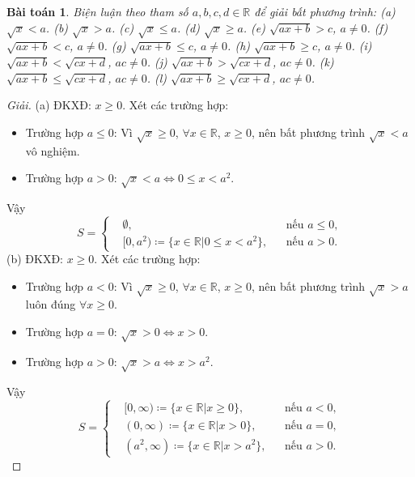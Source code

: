 \documentclass{article}
\newtheorem{baitoan}{Bài toán}
\begin{document}
\begin{baitoan}
	Biện luận theo tham số $a,b,c,d\in\mathbb{R}$ để giải bất phương trình: (a) $\sqrt{x} < a$. (b) $\sqrt{x} > a$. (c) $\sqrt{x}\le a$. (d) $\sqrt{x}\ge a$. (e) $\sqrt{ax + b} > c$, $a\ne0$. (f) $\sqrt{ax + b} < c$, $a\ne0$. (g) $\sqrt{ax + b}\le c$, $a\ne0$. (h) $\sqrt{ax + b}\ge c$, $a\ne0$. (i) $\sqrt{ax + b} < \sqrt{cx + d}$, $ac\ne0$. (j) $\sqrt{ax + b} > \sqrt{cx + d}$, $ac\ne0$. (k) $\sqrt{ax + b}\le\sqrt{cx + d}$, $ac\ne0$. (l) $\sqrt{ax + b}\ge\sqrt{cx + d}$, $ac\ne0$.
\end{baitoan}

\begin{proof}[Giải]
	(a) ĐKXĐ: $x\ge0$. Xét các trường hợp:
	\begin{itemize}
		\item Trường hợp $a\le0$: Vì $\sqrt{x}\ge0$, $\forall x\in\mathbb{R}$, $x\ge 0$, nên bất phương trình $\sqrt{x} < a$ vô nghiệm.
		\item Trường hợp $a > 0$: $\sqrt{x} < a\Leftrightarrow0\le x < a^2$.
	\end{itemize}
	Vậy 
	\begin{equation*}
		S = \left\{\begin{split}
			&\emptyset,&&\mbox{nếu } a\le0,\\
			&[0,a^2)\coloneqq\{x\in\mathbb{R}|0\le x < a^2\},&&\mbox{nếu } a > 0.
		\end{split}\right.
	\end{equation*}
	(b) ĐKXĐ: $x\ge0$. Xét các trường hợp:
	\begin{itemize}
		\item Trường hợp $a < 0$: Vì $\sqrt{x}\ge0$, $\forall x\in\mathbb{R}$, $x\ge 0$, nên bất phương trình $\sqrt{x} > a$ luôn đúng $\forall x\ge0$.
		\item Trường hợp $a = 0$: $\sqrt{x} > 0\Leftrightarrow x > 0$.
		\item Trường hợp $a > 0$: $\sqrt{x} > a\Leftrightarrow x > a^2$.
	\end{itemize}
	Vậy
	\begin{equation*}
		S = \left\{\begin{split}
			&[0,\infty)\coloneqq\{x\in\mathbb{R}|x\ge0\},&&\mbox{nếu } a < 0,\\
			&(0,\infty)\coloneqq\{x\in\mathbb{R}|x > 0\},&&\mbox{nếu } a = 0,\\
			&(a^2,\infty)\coloneqq\{x\in\mathbb{R}|x > a^2\},&&\mbox{nếu } a > 0.
		\end{split}\right.
	\end{equation*}

\end{proof}
\end{document}
